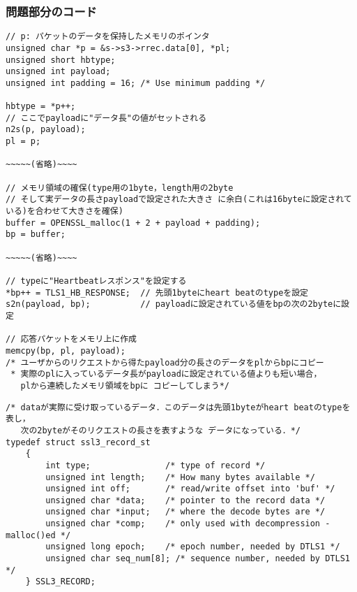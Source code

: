 \subsubsection{問題部分のコード}
\begin{verbatim}
// p: パケットのデータを保持したメモリのポインタ
unsigned char *p = &s->s3->rrec.data[0], *pl;
unsigned short hbtype;
unsigned int payload;
unsigned int padding = 16; /* Use minimum padding */

hbtype = *p++;
// ここでpayloadに"データ長"の値がセットされる
n2s(p, payload);
pl = p;

~~~~~(省略)~~~~

// メモリ領域の確保(type用の1byte，length用の2byte
// そして実データの長さpayloadで設定された大きさ に余白(これは16byteに設定されている)を合わせて大きさを確保)
buffer = OPENSSL_malloc(1 + 2 + payload + padding);
bp = buffer;

~~~~~(省略)~~~~

// typeに"Heartbeatレスポンス"を設定する
*bp++ = TLS1_HB_RESPONSE;  // 先頭1byteにheart beatのtypeを設定
s2n(payload, bp);          // payloadに設定されている値をbpの次の2byteに設定

// 応答パケットをメモリ上に作成
memcpy(bp, pl, payload);
/* ユーザからのリクエストから得たpayload分の長さのデータをplからbpにコピー
 * 実際のplに入っているデータ長がpayloadに設定されている値よりも短い場合，
   plから連続したメモリ領域をbpに コピーしてしまう*/
\end{verbatim}

\begin{verbatim}
/* dataが実際に受け取っているデータ．このデータは先頭1byteがheart beatのtypeを表し，
   次の2byteがそのリクエストの長さを表すような データになっている．*/
typedef struct ssl3_record_st
    {
        int type;               /* type of record */
        unsigned int length;    /* How many bytes available */
        unsigned int off;       /* read/write offset into 'buf' */
        unsigned char *data;    /* pointer to the record data */
        unsigned char *input;   /* where the decode bytes are */
        unsigned char *comp;    /* only used with decompression - malloc()ed */
        unsigned long epoch;    /* epoch number, needed by DTLS1 */
        unsigned char seq_num[8]; /* sequence number, needed by DTLS1 */
    } SSL3_RECORD;
\end{verbatim}

